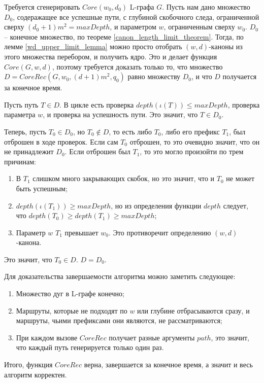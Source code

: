 \documentclass{article}
\newenvironment{proof}[1][Доказательство]{\begin{trivlist}
\item[\hskip \labelsep {\bfseries #1}]}{\end{trivlist}}
\newcommand{\qed}{\nobreak \ifvmode \relax \else
      \ifdim\lastskip<1.5em \hskip-\lastskip
      \hskip1.5em plus0em minus0.5em \fi \nobreak
      \vrule height0.75em width0.5em depth0.25em\fi}
\begin{document}
\begin{proof}
    Требуется сгенерировать $Core(w_0, d_0)$ L-графа $G$. 
    Пусть нам дано множество $D_0$, содеражащее все успешные пути, 
    с глубиной скобочного следа, ограниченной сверху $(d_0+1)m^2 = maxDepth$, 
    и параметром $w$, ограниченным сверху $w_0$. 
    $D_0$ -- конечное множество, по теореме \ref{canon_length_limit_theorem}.
    Тогда, по лемме \ref{wd_upper_limit_lemma} можно просто отобрать $(w,d)$-каноны из этого множества перебором, 
    и получить ядро. 
    Это и делает функция $Core(G, w, d)$, поэтому требуется доказать только то, 
    что множество $D = CoreRec(G, w_0, (d+1)m^2, q_0)$ равно множеству $D_0$, и что $D$ получается за конечное время.

    Пусть путь $T \in D$. В цикле есть проверка $depth(\iota(T)) \leq maxDepth$, проверка параметра $w$, и проверка на успешность пути.
    Это значит, что $T \in D_0$.

    Теперь, пусть $T_0 \in D_0$, но $T_0 \notin D$, то есть либо $T_0$, либо его префикс $T_1$, был отброшен в ходе проверок.
    Если сам $T_0$ отброшен, то это очевидно значит, что он не принадлежит $D_0$.
    Если отброшен был $T_1$, то это могло произойти по трем причинам:
    \begin{enumerate}
        \item В $T_1$ слишком много закрывающих скобок, но это значит, что и $T_0$ не может быть успешным;
        \item $depth(\iota(T_1)) \ge maxDepth$, но из определения функции $depth$ следует, что $depth(T_0) \geq depth(T_1) \ge maxDepth$;
        \item Параметр $w$ $T_1$ превышает $w_0$. Это противоречит определению $(w,d)$-канона.
    \end{enumerate}
    Это значит, что $T_0 \in D$. $D = D_0$.

    Для доказательства завершаемости алгоритма можно заметить следующее:
    \begin{enumerate}
        \item Множество дуг в L-графе конечно;
        \item Маршруты, которые не подходят по $w$ или глубине отбрасываются сразу, и маршруты, чьими префиксами они являются, не рассматриваются;
        \item При каждом вызове $CoreRec$ получает разные аргументы $path$, это значит, что каждый путь генерируется только один раз.
    \end{enumerate}

    Итого, функция $CoreRec$ верна, завершается за конечное время, а значит и весь алгоритм корректен. \qed
\end{proof}
\end{document}
